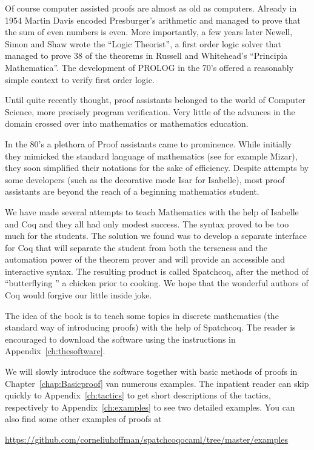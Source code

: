 Of course computer assisted proofs are almost as old as computers. Already in 1954  Martin Davis encoded Presburger's arithmetic and managed to prove that the sum of even numbers is even. More importantly, a few years later  Newell, Simon and  Shaw wrote  the ``Logic Theorist'', a first order logic solver that managed to prove 38 of the theorems in Russell and Whitehead's  ``Principia Mathematica''. The development of PROLOG in the 70's offered a reasonably simple context to verify first order logic.

Until quite recently thought, proof assistants belonged to the world of Computer Science, more precisely program verification. Very little of the advances in the domain crossed over into mathematics or mathematics education.

In the 80's a plethora of Proof assistants came to prominence. While initially they	 mimicked the standard language of mathematics (see for example Mizar), they soon simplified  their notations for the sake of efficiency. Despite attempts by some developers (such as the decorative mode Isar for Isabelle), most proof assistants are beyond the reach of a beginning mathematics student.


We have made several attempts to teach Mathematics with the help of Isabelle and Coq and they all had only modest success. The syntax proved to be too much for the students. The solution we found was to develop a separate interface for Coq that will separate the student from both the terseness and the automation power of the theorem prover and will provide an accessible and interactive syntax. The resulting product is called Spatchcoq, after the method of ``butterflying '' a chicken prior to cooking. We hope that the wonderful authors of Coq would forgive our little inside joke.

The idea of the book is to teach some topics in discrete mathematics (the standard way of introducing proofs) with the help of Spatchcoq. The reader is encouraged to download the software using the instructions in Appendix~\ref{ch:thesoftware}. 


 We will slowly introduce the software together with basic methods of proofs in Chapter~\ref{chap:Basicproof} van numerous examples. The inpatient reader can skip quickly to Appendix~\ref{ch:tactics} to get short descriptions of the tactics, respectively to Appendix~\ref{ch:examples} to see two detailed examples. You can also find some other examples of proofs at 
 
 \url{https://github.com/corneliuhoffman/spatchcoqocaml/tree/master/examples}


 

